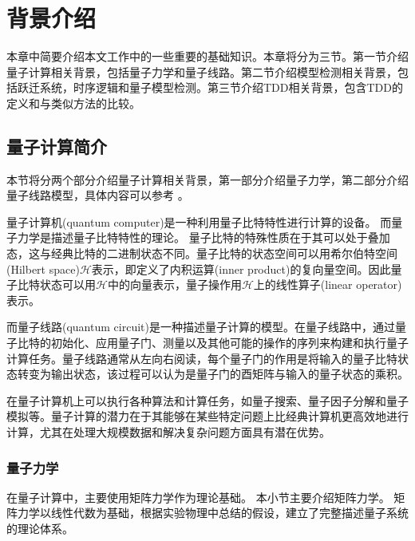 \chapter{背景介绍}
本章中简要介绍本文工作中的一些重要的基础知识。本章将分为三节。第一节介绍量子计算相关背景，包括量子力学和量子线路。第二节介绍模型检测相关背景，包括跃迁系统，时序逻辑和量子模型检测。第三节介绍TDD相关背景，包含TDD的定义和与类似方法的比较。
\section{量子计算简介}
本节将分两个部分介绍量子计算相关背景，第一部分介绍量子力学，第二部分介绍量子线路模型，具体内容可以参考
\citep{nielsen2010quantum}。

量子计算机(quantum computer)是一种利用量子比特特性进行计算的设备。
而量子力学是描述量子比特特性的理论。
量子比特的特殊性质在于其可以处于叠加态，这与经典比特的二进制状态不同。量子比特的状态空间可以用希尔伯特空间(Hilbert space)\(\mathcal{H}\)表示\citep{nielsen2010quantum}，即定义了内积运算(inner product)的复向量空间。因此量子比特状态可以用\(\mathcal{H}\)中的向量表示，量子操作用\(\mathcal{H}\)上的线性算子(linear operator)表示。

而量子线路(quantum circuit)是一种描述量子计算的模型\citep{nielsen2010quantum}。在量子线路中，通过量子比特的初始化、应用量子门、测量以及其他可能的操作的序列来构建和执行量子计算任务。量子线路通常从左向右阅读，每个量子门的作用是将输入的量子比特状态转变为输出状态，该过程可以认为是量子门的酉矩阵与输入的量子状态的乘积。

在量子计算机上可以执行各种算法和计算任务，如量子搜索\citep{Grover_1996}、量子因子分解\citep{Shor}和量子模拟\citep{Feynman}等。量子计算的潜力在于其能够在某些特定问题上比经典计算机更高效地进行计算，尤其在处理大规模数据和解决复杂问题方面具有潜在优势。

\subsection{量子力学}
在量子计算中，主要使用矩阵力学作为理论基础。
本小节主要介绍矩阵力学。
矩阵力学以线性代数为基础，根据实验物理中总结的假设，建立了完整描述量子系统的理论体系。
